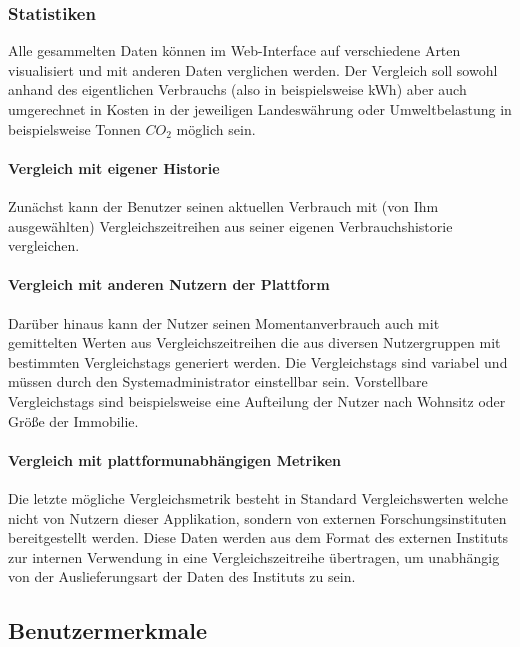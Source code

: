 \subsubsection{Statistiken}

Alle gesammelten Daten können im Web-Interface auf verschiedene Arten visualisiert und mit anderen Daten verglichen werden. Der Vergleich soll sowohl anhand des eigentlichen Verbrauchs (also in beispielsweise kWh) aber auch umgerechnet in Kosten in der jeweiligen Landeswährung oder Umweltbelastung in beispielsweise Tonnen $CO_2$ möglich sein.

\paragraph{Vergleich mit eigener Historie}

Zunächst kann der Benutzer seinen aktuellen Verbrauch  mit (von Ihm ausgewählten) Vergleichszeitreihen aus seiner eigenen Verbrauchshistorie vergleichen.


\paragraph{Vergleich mit anderen Nutzern der Plattform}
Darüber hinaus kann der Nutzer seinen Momentanverbrauch auch mit gemittelten Werten aus Vergleichszeitreihen die aus diversen Nutzergruppen mit bestimmten Vergleichstags generiert werden. Die Vergleichstags sind variabel und müssen durch den Systemadministrator einstellbar sein. Vorstellbare Vergleichstags sind beispielsweise eine Aufteilung der Nutzer nach Wohnsitz oder Größe der Immobilie.


\paragraph{Vergleich mit plattformunabhängigen Metriken}
\label{vgl_plattformunabhängig}

Die letzte mögliche Vergleichsmetrik besteht in Standard Vergleichswerten welche nicht von Nutzern dieser Applikation, sondern von externen Forschungsinstituten bereitgestellt werden.
Diese Daten werden aus dem Format des externen Instituts zur internen Verwendung in eine Vergleichszeitreihe übertragen, um unabhängig von der Auslieferungsart der Daten des Instituts zu sein.

\subsection{Benutzermerkmale}\label{sec:desc_user}

